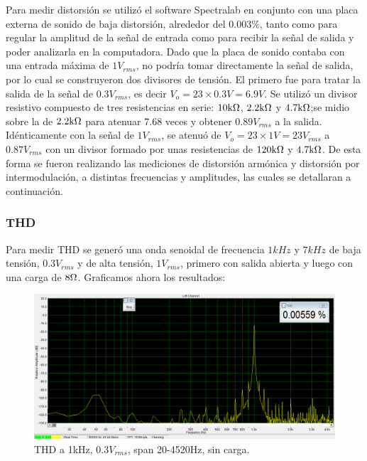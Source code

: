 Para medir distorsión se utilizó el software Spectralab en conjunto con una placa externa de sonido de baja distorsión, alrededor del $0.003\%$, tanto como para regular la amplitud de la señal de entrada como para recibir la señal de salida y poder analizarla en la computadora.
Dado que la placa de sonido contaba con una entrada máxima de $1V_{rms}$, no podría tomar directamente la señal de salida, por lo cual se construyeron dos divisores de tensión. El primero fue para tratar la salida de la señal de $0.3V_{rms}$, es decir $V_o=23 \times 0.3V=6.9V$. Se utilizó un divisor resistivo compuesto de tres resistencias en serie: $10\kohm$, $2.2\kohm$ y $4.7\kohm$;se midio sobre la de $2.2\kohm$ para atenuar 7.68 veces y obtener $0.89V_{rms}$ a la salida. Idénticamente con la señal de $1V_{rms}$, se atenuó de $V_o=23\times1V=23V_{rms}$ a $0.87V_{rms}$ con un divisor formado por unas resistencias de $120\kohm$ y  $4.7\kohm$.
De esta forma se fueron realizando las mediciones de distorsión armónica y distorsión por intermodulación, a distintas frecuencias y amplitudes, las cuales se detallaran a continuación.

\subsubsection*{THD}

Para medir THD se generó una onda senoidal de frecuencia $1kHz$ y $7kHz$ de baja tensión, $0.3V_{rms}$ y de alta tensión, $1V_{rms}$, primero con salida abierta y luego con una carga de $8\ohm$. Graficamos ahora los resultados:

\begin{figure}[H]
\centering
\includegraphics[width=\textwidth]{img/Distorsion/THD_1k_03V_span_20_4520.png}
\caption{THD a 1kHz, $0.3V_{rms}$, span 20-4520Hz, sin carga.}
\label{THD1} 
\end{figure}


